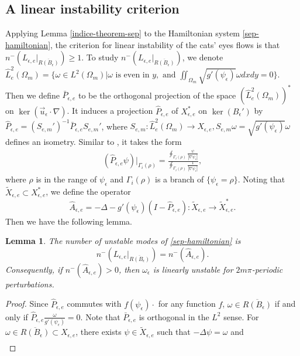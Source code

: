 \documentclass[1 [leqno, 11pt]{amsart}
\numberwithin{equation}{section}
\let\ep=\epsilon
\newtheorem{lemma}[Theorem]{Lemma}
\begin{document}
\begin{CJK*}{GBK}{song}
\subsection{A linear instability criterion}
Applying Lemma \ref{indice-theorem-sep} to the Hamiltonian system \eqref{sep-hamiltonian},  the criterion for  linear instability of the cats' eyes flows is  that   $n^-\left( L_{\ep,e} |_{\overline{R(B_\ep)}} \right) \geq 1$.
To study $n^-\left( L_{\ep,e} |_{\overline{R(B_\ep)}} \right)$,  we denote $\hat L_e^2(\Omega_m)=\{\omega\in L^2(\Omega_m)|\omega \text{ is even in }y,\text{ and }\iint_{\Omega_m}\sqrt{g'(\psi_\ep)}\omega dxdy=0\}$. Then we define
$\bar{P}_{\ep,e}$ to be the orthogonal   projection of the space $ (\hat L_e^2(\Omega_m))^*$ on $\ker(\vec{u}_\ep\cdot\nabla)$. It induces  a   projection
$\hat{P}_{\ep,e}$ of $X_{\ep, e}^*$ on $\ker (B_\ep')$ by $\hat{P}_{\ep,e}=(S_{e,m}')^{-1}\bar{P}_{\ep,e} S_{e,m}'$, where
$S_{e,m}: \hat L_e^2(\Omega_m) \rightarrow X_{\ep,e},  S_{e,m}\omega = \sqrt{g'(\psi_\ep)}\omega$
defines an isometry.
Similar to \cite{lin2004some}, it takes the form
\begin{align}\label{def-hat-P-ep-e}
(\hat{P}_{\ep,e} \psi)|_{\Gamma_{i}(\rho)} = \frac{\oint_{\Gamma_i (\rho)} \frac{\psi}{|\nabla \psi_\ep|}}{\oint_{\Gamma_i (\rho)} \frac{1}{|\nabla \psi_\ep|}},\end{align}
where $\rho$ is in the range of $\psi_\ep$ and $\Gamma_i(\rho)$ is a branch of $\{\psi_\ep = \rho\}$. Noting that $\tilde{X}_{\ep, e}\subset X_{\ep, e}^*$, we  define the operator
$$\hat{A}_{\ep,e} = - \Delta - g'(\psi_\ep)(I - \hat{P}_{\ep,e}): \tilde{X}_{\ep, e} \rightarrow \tilde{X}^*_{\ep, e}.$$
Then we have the following lemma.
\begin{lemma}\label{L e-hat A} The number of unstable modes of \eqref{sep-hamiltonian} is
$$n^-\left( L_{\ep,e} |_{\overline{R(B_\ep)}} \right) = n^-\left(\hat{A}_{\ep,e}\right).$$
Consequently, if $n^-\left(\hat{A}_{\ep,e}\right)>0$, then $\omega_\ep$ is linearly unstable for $2m\pi$-periodic perturbations.
\end{lemma}
\begin{proof} Since $\hat{P}_{\ep,e}$  commutes with $f(\psi_\ep)\cdot$ for any function $f$,  $\omega \in \overline{R(B_\ep)}$ if and only if $\hat{P}_{\ep,e} \frac{\omega}{g'(\psi_\ep)} = 0$. Note that $\bar{P}_{\ep,e}$ is orthogonal in the $L^2$ sense.
For $\omega \in \overline{R(B_\ep)}\subset X_{\ep,e}$, there exists $\psi \in \tilde{X}_{\ep, e}$ such that $-\Delta\psi=\omega$ and
\begin{align*}

\end{align*}
\end{proof}
\end{CJK*}
\end{document}
